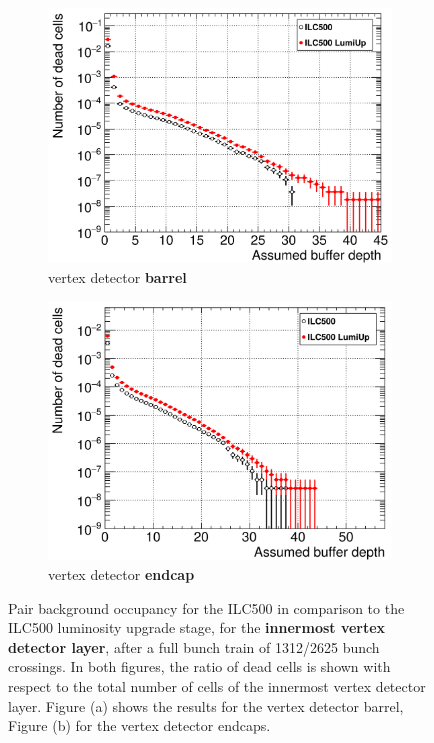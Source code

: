   \begin{figure}
 \centering
  \begin{subfigure}[b]{0.49\textwidth}
   \centering
    \includegraphics[width=\textwidth]{Figures/Pairs/Occupancy_Comparison_Layer_0_deadcells_ILC500_LumiUp.png}
   \caption{\sid vertex detector \textbf{barrel}}
   \end{subfigure}
   \hfill
    \begin{subfigure}[b]{0.49\textwidth}
   \centering
    \includegraphics[width=\textwidth]{Figures/Pairs/Occupancy_Comparison_Layer_0_deadcells_ILC500_LumiUp_SiVertexEndcap.png}
   \caption{\sid vertex detector \textbf{endcap}}
   \end{subfigure}
   \caption[Pair background occupancy in the \sid vertex detector for the ILC500 and the ILC500 ``Lumi Up'']{Pair background occupancy for the ILC500 in comparison to the ILC500 luminosity upgrade stage, for the \textbf{innermost \sid vertex detector layer}, after a full bunch train of \num{1312}/\num{2625} bunch crossings.
   In both figures, the ratio of dead cells is shown with respect to the total number of cells of the innermost vertex detector layer.
   Figure (a) shows the results for the vertex detector barrel, Figure (b) for the vertex detector endcaps.
   }
   \label{fig:PairBkg:ILC500-ILC500LumiUp_Occupancy}
 \end{figure}
 

